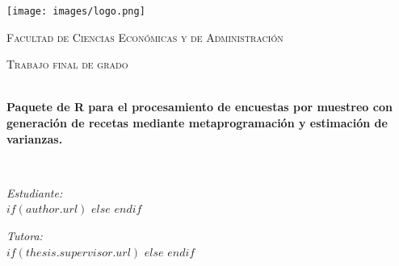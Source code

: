 \frontmatter %

\pagestyle{plain} %


\begin{titlepage}
\begin{center}

\vspace*{.06\textheight}
\texttt{[image: images/logo.png]} %
{\scshape\LARGE \univname\par}\vspace{1.5cm} %
{\scshape\LARGE Facultad de Ciencias Económicas y de Administración\par}\vspace{1.5cm} %
\textsc{\Large Trabajo final de grado}\\[0.5cm] %

\HRule \\[0.4cm] %
{\huge \bfseries \ttitle\par}\vspace{0.4cm} %
{\bfseries Paquete de R para el procesamiento de encuestas por muestreo con generación de recetas mediante metaprogramación y estimación de varianzas.\par}\vspace{0.4cm} %
\HRule \\[1.5cm] %
 
\begin{minipage}[t]{0.4\textwidth}
\begin{flushleft} \large
\emph{Estudiante:}\\
$if(author.url)$
\href{$author.url$}{\authorname} %
$else$
\authorname
$endif$
\end{flushleft}
\end{minipage}
\begin{minipage}[t]{0.4\textwidth}
\begin{flushright} \large
\emph{Tutora:} \\
$if(thesis.supervisor.url)$%
\href{$thesis.supervisor.url$}{\supname} %
$else$%
\supname
$endif$
\end{flushright}
\end{minipage}\\[3cm]
 

\end{center}
\end{titlepage}
